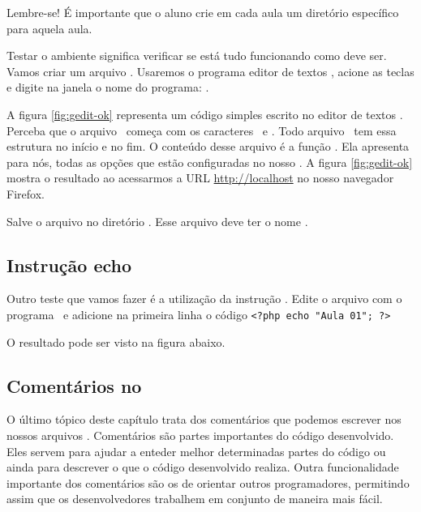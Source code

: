 Lembre-se! É importante que o aluno crie em cada aula um diretório 
específico para aquela aula.

Testar o ambiente significa verificar se está tudo funcionando como deve ser. Vamos criar um 
arquivo \phpextensao. Usaremos o programa editor de textos \gedit, acione as teclas \altfdois 
e digite na janela o nome do programa: \gedit. 

A figura \ref{fig:gedit-ok} representa um código simples escrito no editor de textos \gedit. 
Perceba que o arquivo \phpextensao~começa com os caracteres \phpinicio~e \phpfim. 
Todo arquivo \phpextensao~tem essa estrutura no início e no fim. O conteúdo desse arquivo é 
a função \funcaophpinfo. Ela apresenta para nós, todas as opções que estão configuradas no 
nosso \php. A figura \ref{fig:gedit-ok} mostra o resultado ao acessarmos a URL \url{http://localhost} 
no nosso navegador Firefox.

Salve o arquivo no diretório . Esse arquivo deve ter o nome .


\subsection{Instrução echo}
\label{subsection:funcao-echo}
Outro teste que vamos fazer é a utilização da instrução \funcaoecho. Edite o arquivo 
 com o programa \gedit~e adicione na primeira linha o código
\texttt{<?php echo "Aula 01"; ?>}



O resultado pode ser visto na figura abaixo.

\subsection{Comentários no \php}
\label{subsection:comentarios-no-php}

O último tópico deste capítulo trata dos comentários que podemos escrever nos nossos
arquivos \phpextensao. Comentários são partes importantes do código desenvolvido.
Eles servem para ajudar a enteder melhor determinadas partes do código ou ainda
para descrever o que o código desenvolvido realiza. Outra funcionalidade
importante dos comentários são os de orientar outros programadores, permitindo assim
que os desenvolvedores trabalhem em conjunto de maneira mais fácil.

